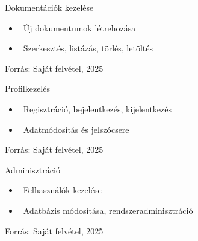 \documentclass[11pt]{beamer}
\begin{document}
\begin{frame}{Dokumentációk kezelése}
    \begin{center}
    \end{center}
    \begin{itemize}
      \item \faFileMedical~Új dokumentumok létrehozása
      \item \faEdit~Szerkesztés, listázás, törlés, letöltés
    \end{itemize}
    \begin{center}
        \scriptsize Forrás: Saját felvétel, 2025
    \end{center}
\end{frame}

\begin{frame}{Profilkezelés}
    \begin{center}
    \end{center}
    \begin{itemize}
      \item \faDoorOpen~Regisztráció, bejelentkezés, kijelentkezés
      \item \faUserEdit~Adatmódosítás és jelszócsere
    \end{itemize}
      \begin{center}
        \scriptsize Forrás: Saját felvétel, 2025
      \end{center}
\end{frame}

\begin{frame}{Adminisztráció}
    \begin{center}
    \end{center}
    \begin{itemize}
      \item \faUserCog~Felhasználók kezelése
      \item \faCogs~Adatbázis módosítása, rendszeradminisztráció
    \end{itemize}
  \begin{center}
    \scriptsize Forrás: Saját felvétel, 2025
  \end{center}
\end{frame}
\end{document}
